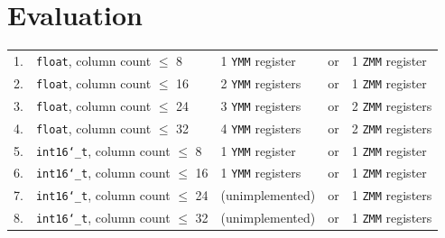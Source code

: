 \documentclass[logo,bsc,singlespacing,parskip]{infthesis}
\newcommand{\dtshort}{\texttt{int16\char`_t}}
\newcommand{\dtfloat}{\texttt{float}}
\newcommand{\pivot}{\texttt{pivot}}
\newcommand{\ymm}{\texttt{YMM}}
\newcommand{\zmm}{\texttt{ZMM}}
\begin{document}
\section{Evaluation}
\vspace*{-4mm}
\begin{table}[H]
\centering
\begin{tabular}{lllll}
    1. & \dtfloat{}, column count $\leq$ 8  & 1 \ymm{} register  & or &  1 \zmm{} register   \\
    2. & \dtfloat{}, column count $\leq$ 16 & 2 \ymm{} registers & or & 1 \zmm{} register   \\
    3. & \dtfloat{}, column count $\leq$ 24 & 3 \ymm{} registers & or & 2 \zmm{} registers   \\
    4. & \dtfloat{}, column count $\leq$ 32 & 4 \ymm{} registers & or & 2 \zmm{} registers  \\
    5. & \dtshort{}, column count $\leq$ 8  & 1 \ymm{} register  & or &  1 \zmm{} register   \\
    6. & \dtshort{}, column count $\leq$ 16 & 1 \ymm{} registers & or & 1 \zmm{} register   \\
    7. & \dtshort{}, column count $\leq$ 24 & (unimplemented) & or & 1 \zmm{} registers   \\
    8. & \dtshort{}, column count $\leq$ 32 & (unimplemented) & or & 1 \zmm{} registers  
    \end{tabular}
\end{table}
\vspace*{-8mm}




\end{document}
